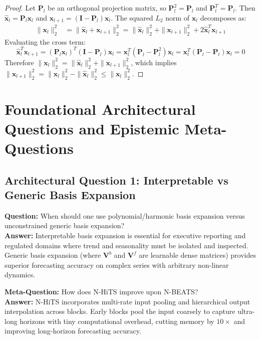\documentclass[11pt,a4paper]{article}
\theoremstyle{definition}
\begin{document}
\begin{proof}
Let $\mathbf{P}_l$ be an orthogonal projection matrix, so $\mathbf{P}_l^2 = \mathbf{P}_l$ and $\mathbf{P}_l^T = \mathbf{P}_l$.
Then $\widehat{\mathbf{x}}_l = \mathbf{P}_l \mathbf{x}_l$ and $\mathbf{x}_{l+1} = (\mathbf{I} - \mathbf{P}_l) \mathbf{x}_l$.
The squared $L_2$ norm of $\mathbf{x}_l$ decomposes as:
{\boldmath
\begin{align}
\|\mathbf{x}_l\|_2^2 &= \|\widehat{\mathbf{x}}_l + \mathbf{x}_{l+1}\|_2^2 = \|\widehat{\mathbf{x}}_l\|_2^2 + \|\mathbf{x}_{l+1}\|_2^2 + 2 \widehat{\mathbf{x}}_l^T \mathbf{x}_{l+1}
\end{align}
}
Evaluating the cross term:
{\boldmath
\begin{equation}
\widehat{\mathbf{x}}_l^T \mathbf{x}_{l+1} = (\mathbf{P}_l \mathbf{x}_l)^T (\mathbf{I} - \mathbf{P}_l) \mathbf{x}_l = \mathbf{x}_l^T (\mathbf{P}_l - \mathbf{P}_l^2) \mathbf{x}_l = \mathbf{x}_l^T (\mathbf{P}_l - \mathbf{P}_l) \mathbf{x}_l = 0
\end{equation}
}
Therefore $\|\mathbf{x}_l\|_2^2 = \|\widehat{\mathbf{x}}_l\|_2^2 + \|\mathbf{x}_{l+1}\|_2^2$, which implies $\|\mathbf{x}_{l+1}\|_2^2 = \|\mathbf{x}_l\|_2^2 - \|\widehat{\mathbf{x}}_l\|_2^2 \le \|\mathbf{x}_l\|_2^2$.
\end{proof}

\section{Foundational Architectural Questions and Epistemic Meta-Questions}

\subsection{Architectural Question 1: Interpretable vs Generic Basis Expansion}
\textbf{Question:} When should one use polynomial/harmonic basis expansion versus unconstrained generic basis expansion?\\
\textbf{Answer:} Interpretable basis expansion is essential for executive reporting and regulated domains where trend and seasonality must be isolated and inspected. Generic basis expansion (where $\mathbf{V}^b$ and $\mathbf{V}^f$ are learnable dense matrices) provides superior forecasting accuracy on complex series with arbitrary non-linear dynamics.

\textbf{Meta-Question:} How does N-HiTS improve upon N-BEATS?\\
\textbf{Answer:} N-HiTS incorporates multi-rate input pooling and hierarchical output interpolation across blocks. Early blocks pool the input coarsely to capture ultra-long horizons with tiny computational overhead, cutting memory by $10\times$ and improving long-horizon forecasting accuracy.
\end{document}
